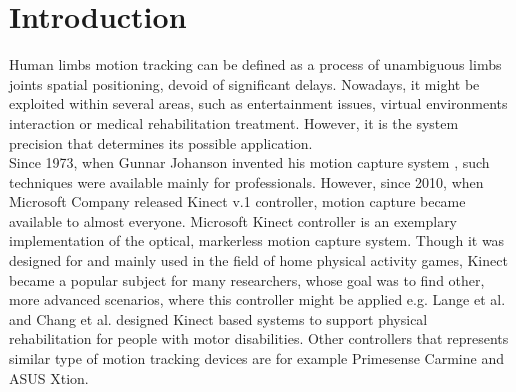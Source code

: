 \documentclass[sensors,article,submit,moreauthors,pdftex,10pt,a4paper]{mdpi}
\begin{document}


\section{Introduction}

Human limbs motion tracking can be defined as a process of unambiguous limbs joints spatial positioning, devoid of significant delays. Nowadays, it might be exploited within several areas, such as entertainment issues, virtual environments interaction or medical rehabilitation treatment. However, it is the system precision that determines its possible application. \\
Since 1973, when Gunnar Johanson invented his motion capture system \cite{Johansson1973}, such techniques were available mainly for professionals. However, since 2010, when Microsoft Company released Kinect v.1 controller, motion capture became available to almost everyone. Microsoft Kinect controller is an exemplary implementation of the optical, markerless motion capture system. Though it was designed for and mainly used in the field of home physical activity games, Kinect became a popular subject for many researchers, whose goal was to find other, more advanced scenarios, where this controller might be applied e.g. Lange et al. \cite{Lange2012} and Chang et al.\cite{Chang2011} designed Kinect based systems to support physical rehabilitation for people with motor disabilities. Other controllers that represents similar type of motion tracking devices are for example Primesense Carmine and ASUS Xtion.
\end{document}

